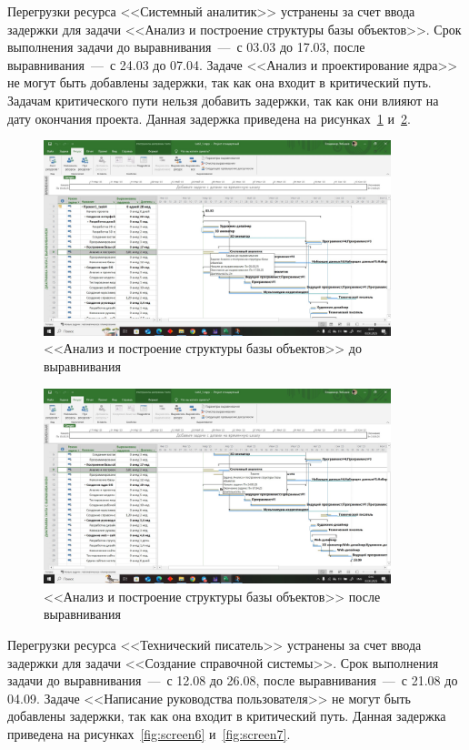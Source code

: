 Перегрузки ресурса <<Системный аналитик>> устранены за счет ввода задержки для задачи <<Анализ и построение структуры базы объектов>>.
Срок выполнения задачи до выравнивания~---~с 03.03 до 17.03, после выравнивания~---~с 24.03 до 07.04.
Задаче <<Анализ и проектирование ядра>> не могут быть добавлены задержки, так как она входит в критический путь.
Задачам критического пути нельзя добавить задержки, так как они влияют на дату окончания проекта.
Данная задержка приведена на рисунках~\ref{fig:screen4} и~\ref{fig:screen5}.

\begin{figure}[H]
	\centering
	\includegraphics[width=0.9\textwidth]{img/lab3/task1/screen4.jpg}
	\caption{<<Анализ и построение структуры базы объектов>> до выравнивания}
	\label{fig:screen4}
\end{figure}

\begin{figure}[H]
	\centering
	\includegraphics[width=0.9\textwidth]{img/lab3/task1/screen5.jpg}
	\caption{<<Анализ и построение структуры базы объектов>> после выравнивания}
	\label{fig:screen5}
\end{figure}

Перегрузки ресурса <<Технический писатель>> устранены за счет ввода задержки для задачи <<Создание справочной системы>>.
Срок выполнения задачи до выравнивания~---~с 12.08 до 26.08, после выравнивания~---~с 21.08 до 04.09.
Задаче <<Написание руководства пользователя>> не могут быть добавлены задержки, так как она входит в критический путь.
Данная задержка приведена на рисунках~\ref{fig:screen6} и~\ref{fig:screen7}.


